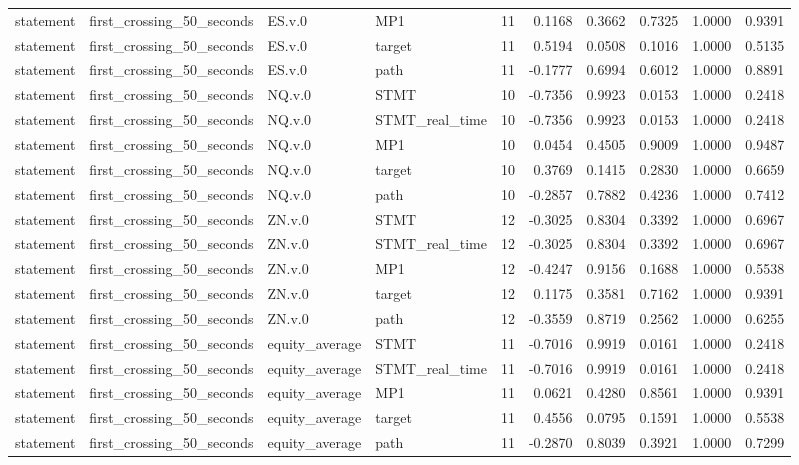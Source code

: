 \begin{tabular}{llllrrrrrr}
statement & first_crossing_50_seconds & ES.v.0 & MP1 & 11 & 0.1168 & 0.3662 & 0.7325 & 1.0000 & 0.9391 \\
statement & first_crossing_50_seconds & ES.v.0 & target & 11 & 0.5194 & 0.0508 & 0.1016 & 1.0000 & 0.5135 \\
statement & first_crossing_50_seconds & ES.v.0 & path & 11 & -0.1777 & 0.6994 & 0.6012 & 1.0000 & 0.8891 \\
statement & first_crossing_50_seconds & NQ.v.0 & STMT & 10 & -0.7356 & 0.9923 & 0.0153 & 1.0000 & 0.2418 \\
statement & first_crossing_50_seconds & NQ.v.0 & STMT_real_time & 10 & -0.7356 & 0.9923 & 0.0153 & 1.0000 & 0.2418 \\
statement & first_crossing_50_seconds & NQ.v.0 & MP1 & 10 & 0.0454 & 0.4505 & 0.9009 & 1.0000 & 0.9487 \\
statement & first_crossing_50_seconds & NQ.v.0 & target & 10 & 0.3769 & 0.1415 & 0.2830 & 1.0000 & 0.6659 \\
statement & first_crossing_50_seconds & NQ.v.0 & path & 10 & -0.2857 & 0.7882 & 0.4236 & 1.0000 & 0.7412 \\
statement & first_crossing_50_seconds & ZN.v.0 & STMT & 12 & -0.3025 & 0.8304 & 0.3392 & 1.0000 & 0.6967 \\
statement & first_crossing_50_seconds & ZN.v.0 & STMT_real_time & 12 & -0.3025 & 0.8304 & 0.3392 & 1.0000 & 0.6967 \\
statement & first_crossing_50_seconds & ZN.v.0 & MP1 & 12 & -0.4247 & 0.9156 & 0.1688 & 1.0000 & 0.5538 \\
statement & first_crossing_50_seconds & ZN.v.0 & target & 12 & 0.1175 & 0.3581 & 0.7162 & 1.0000 & 0.9391 \\
statement & first_crossing_50_seconds & ZN.v.0 & path & 12 & -0.3559 & 0.8719 & 0.2562 & 1.0000 & 0.6255 \\
statement & first_crossing_50_seconds & equity_average & STMT & 11 & -0.7016 & 0.9919 & 0.0161 & 1.0000 & 0.2418 \\
statement & first_crossing_50_seconds & equity_average & STMT_real_time & 11 & -0.7016 & 0.9919 & 0.0161 & 1.0000 & 0.2418 \\
statement & first_crossing_50_seconds & equity_average & MP1 & 11 & 0.0621 & 0.4280 & 0.8561 & 1.0000 & 0.9391 \\
statement & first_crossing_50_seconds & equity_average & target & 11 & 0.4556 & 0.0795 & 0.1591 & 1.0000 & 0.5538 \\
statement & first_crossing_50_seconds & equity_average & path & 11 & -0.2870 & 0.8039 & 0.3921 & 1.0000 & 0.7299 \\

\end{tabular}
